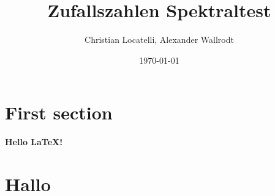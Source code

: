 \documentclass[12pt]{article}
\title{Zufallszahlen Spektraltest}
\author{Christian Locatelli, Alexander Wallrodt}
\date{\today}
\begin{document}
    \maketitle
    \clearpage

    \tableofcontents
    \listoffigures
    \listoftables
    \clearpage


    \section{First section}\label{sec:First section}
    \textbf{Hello \LaTeX!}
    \section{Hallo}\label{sec:hallo}
\end{document}

